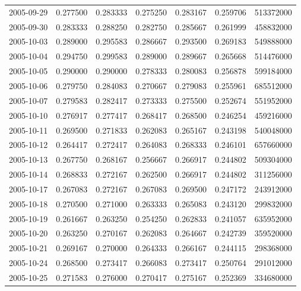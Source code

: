 \begin{tabular}{lrrrrrr}
2005-09-29 &    0.277500 &    0.283333 &    0.275250 &    0.283167 &    0.259706 &   513372000 \\
2005-09-30 &    0.283333 &    0.288250 &    0.282750 &    0.285667 &    0.261999 &   458832000 \\
2005-10-03 &    0.289000 &    0.295583 &    0.286667 &    0.293500 &    0.269183 &   549888000 \\
2005-10-04 &    0.294750 &    0.299583 &    0.289000 &    0.289667 &    0.265668 &   514476000 \\
2005-10-05 &    0.290000 &    0.290000 &    0.278333 &    0.280083 &    0.256878 &   599184000 \\
2005-10-06 &    0.279750 &    0.284083 &    0.270667 &    0.279083 &    0.255961 &   685512000 \\
2005-10-07 &    0.279583 &    0.282417 &    0.273333 &    0.275500 &    0.252674 &   551952000 \\
2005-10-10 &    0.276917 &    0.277417 &    0.268417 &    0.268500 &    0.246254 &   459216000 \\
2005-10-11 &    0.269500 &    0.271833 &    0.262083 &    0.265167 &    0.243198 &   540048000 \\
2005-10-12 &    0.264417 &    0.272417 &    0.264083 &    0.268333 &    0.246101 &   657660000 \\
2005-10-13 &    0.267750 &    0.268167 &    0.256667 &    0.266917 &    0.244802 &   509304000 \\
2005-10-14 &    0.268833 &    0.272167 &    0.262500 &    0.266917 &    0.244802 &   311256000 \\
2005-10-17 &    0.267083 &    0.272167 &    0.267083 &    0.269500 &    0.247172 &   243912000 \\
2005-10-18 &    0.270500 &    0.271000 &    0.263333 &    0.265083 &    0.243120 &   299832000 \\
2005-10-19 &    0.261667 &    0.263250 &    0.254250 &    0.262833 &    0.241057 &   635952000 \\
2005-10-20 &    0.263250 &    0.270167 &    0.262083 &    0.264667 &    0.242739 &   359520000 \\
2005-10-21 &    0.269167 &    0.270000 &    0.264333 &    0.266167 &    0.244115 &   298368000 \\
2005-10-24 &    0.268500 &    0.273417 &    0.266083 &    0.273417 &    0.250764 &   291012000 \\
2005-10-25 &    0.271583 &    0.276000 &    0.270417 &    0.275167 &    0.252369 &   334680000 \\

\end{tabular}
